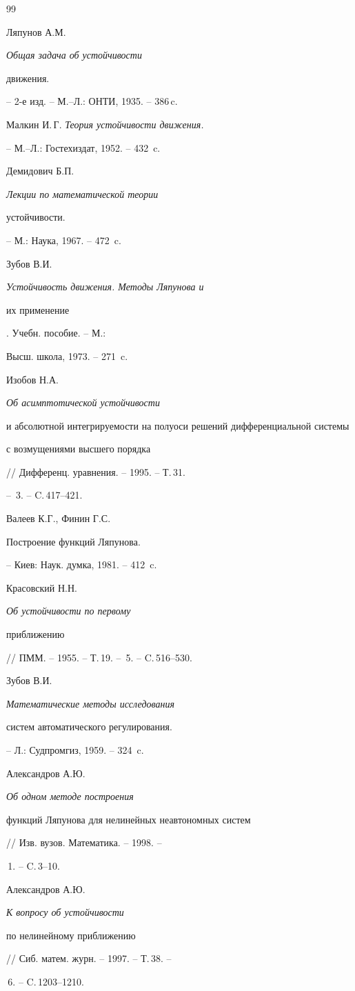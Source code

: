 \begin{thebibliography}{99}







Ляпунов А.М. {\it Общая задача об устойчивости


движения.} -- 2-е изд. -- М.--Л.: ОНТИ, 1935. -- 386\,c.




Малкин И.\,Г. {\it Теория устойчивости движения.}


-- М.--Л.: Гостехиздат, 1952. -- 432~c.




Демидович Б.П. {\it Лекции по математической теории


устойчивости.} -- М.: Наука, 1967. -- 472~c.




Зубов В.И. {\it Устойчивость движения. Методы Ляпунова и


их применение}. Учебн. пособие. -- М.:


Высш. школа, 1973. -- 271~c.




Изобов Н.А. {\it Об асимптотической устойчивости


и абсолютной интегрируемости на полуоси решений дифференциальной системы


с возмущениями высшего порядка} // Дифференц. уравнения. -- 1995. -- Т.\,31.


-- \No\,3. -- C.\,417--421.




Валеев К.Г., Финин Г.С. {\it


Построение функций Ляпунова.} -- Киев: Наук. думка, 1981. -- 412~c.




Красовский Н.Н. {\it Об устойчивости по первому


приближению} // ПММ. -- 1955. -- Т.\,19. -- \No\,5. -- C.\,516--530.




Зубов В.И. {\it Математические методы исследования


систем автоматического регулирования.} -- Л.: Судпромгиз, 1959. -- 324~c.




Александров А.Ю. {\it Об одном методе построения


функций Ляпунова для нелинейных неавтономных систем


} // Изв. вузов. Математика. -- 1998. --


\No\,1. -- C.\,3--10.




Александров А.Ю. {\it К вопросу об устойчивости


по нелинейному приближению} // Сиб. матем. журн. -- 1997. -- Т.\,38. --


\No\,6. -- C.\,1203--1210.





\end{thebibliography}





